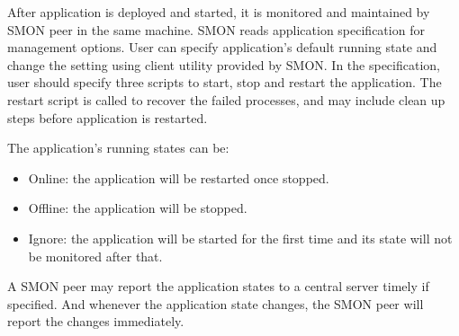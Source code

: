 

After application is deployed and started, it is monitored
and maintained by SMON peer in the same machine. SMON reads
application specification for management options. User can
specify application's default running state and change the
setting using client utility provided by SMON.  In the
specification, user should specify three scripts to start,
stop and restart the application. The restart script is
called to recover the failed processes, and may include
clean up steps before application is restarted.

The application's running states can be:

\begin{itemize}
  \item Online: the application will be restarted once
  stopped.
  \item Offline: the application will be stopped.
  \item Ignore: the application will be started for the
  first time and its state will not be monitored after
  that.
\end{itemize}


A SMON peer may report the application states to a central
server timely if specified. And whenever the application
state changes, the SMON peer will report the changes
immediately.


%
%
%

